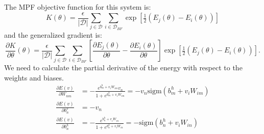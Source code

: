 \documentclass[11pt]{article}
\begin{document}
The MPF objective function for this system is:
\begin{equation}
  \label{eq:RBMObj}
    K(\theta) = \frac{\epsilon}{|\mathcal{D}|}\sum_{j\in\mathcal{D}}\sum_{i\in\mathcal{D}_{BF}}\exp{[\tfrac{1}{2}(E_j(\theta)-E_i(\theta))]}
\end{equation}
and the generalized gradient is:
\begin{equation}
  \label{eq:RBMGrad}
    \frac{\partial K}{\partial \theta}(\theta) 
      = \frac{\epsilon}{|\mathcal{D}|}\sum_{j\in\mathcal{D}}\sum_{i\in\mathcal{D}_{BF}}
      \left[\frac{\partial E_j(\theta)}{\partial \theta}-\frac{\partial E_i(\theta)}{\partial \theta} \right]
      \exp{[\tfrac{1}{2}(E_j(\theta)-E_i(\theta))]}.
\end{equation}
We need to calculate the partial derivative of the energy with respect to the weights and biases.
\begin{align}
  \label{eq:dedw}
    \frac{\partial E(v)}{\partial W_{nm}} &= -\frac{e^{b_m^h+v_iW_{im}}v_n}{1+e^{b_m^h+v_iW_{im}}}
      =-v_n\text{sigm}(b_m^h+v_iW_{im})\\
  \label{eq:dedbv}
    \frac{\partial E(v)}{\partial b_n^v} &= -v_n\\
  \label{eq:dedbh}
    \frac{\partial E(v)}{\partial b_n^h} &= -\frac{e^{b_n^h+v_iW_{in}}}{1+e^{b_n^h+v_iW_{in}}}
      =-\text{sigm}(b_n^h+v_iW_{in})
\end{align}
\end{document}

